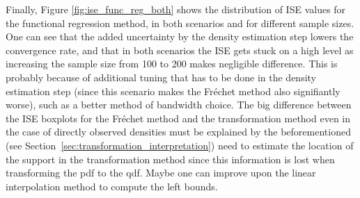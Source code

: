 Finally, Figure \ref{fig:ise_func_reg_both} shows the distribution of ISE values for
the functional regression method, in both scenarios and for different sample sizes. One 
can see that the added uncertainty by the density estimation step lowers the convergence
rate, and that in both scenarios the ISE gets stuck on a high level as increasing the
sample size from 100 to 200 makes negligible difference. This is probably
because of additional tuning that has to be done in the density estimation step (since
this scenario makes the Fréchet method also signifiantly worse), such as a better method
of bandwidth choice. The big difference between the ISE boxplots for the Fréchet method and
the transformation method even in the case of directly observed densities must be explained 
by the beforementioned (see Section~\ref{sec:transformation_interpretation}) need to
estimate the location of the support in the transformation method since this information
is lost when transforming the pdf to the qdf. Maybe one can improve upon the linear
interpolation method to compute the left bounds.
